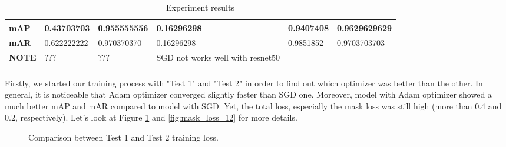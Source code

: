 \begin{longtable}[c]{|p{}|p{}|p{}|p{}|p{}|p{}|}
		\textbf{mAP} & 0.43703703 & 0.955555556 & 0.16296298 & 0.9407408 & 0.9629629629 \\ \hline
		\textbf{mAR} & 0.622222222 & 0.970370370 & 0.16296298 & 0.9851852 & 0.9703703703 \\ \hline
		\textbf{NOTE} & ??? & ??? & SGD not works well with resnet50 &  &  \\ \hline
	
	\caption{Experiment results}
	\label{table:exp2}
	\end{longtable}
	
	Firstly, we started our training process with "Test 1" and "Test 2" in order to find out which optimizer was better than the other. In general, it is noticeable that Adam optimizer converged slightly faster than SGD one. Moreover, model with Adam optimizer showed a much better mAP and mAR compared to model with SGD. Yet, the total loss, especially the mask loss was still high (more than 0.4 and 0.2, respectively). Let's look at Figure \ref{fig:loss_12} and \ref{fig:mask_loss_12} for more details.
	
	\begin{figure}[H]
		\centering
		\hfill %
		\hfill %
		\caption{Comparison between Test 1 and Test 2 training loss.}
		\label{fig:loss_12}
	\end{figure}
	
